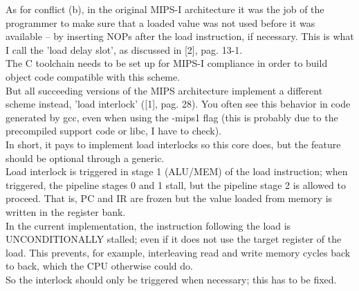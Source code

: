 \documentclass[11pt]{article}
\begin{document}
    As for conflict (b), in the original MIPS-I architecture it was the job
    of the programmer to make sure that a loaded value was not used before it
    was available -- by inserting NOPs after the load instruction, if necessary.
    This is what I call the 'load delay slot', as discussed in [2], pag. 13-1.\\
    
    The C toolchain needs to be set up for MIPS-I compliance in order to build
    object code compatible with this scheme.\\
    But all succeeding versions of the MIPS architecture implement a 
    different scheme instead, 'load interlock' ([1], pag. 28). You often see
    this behavior in code generated by gcc, even when using the -mips1 flag (this 
    is probably due to the precompiled support code or libc, I have to check).\\
    In short, it pays to implement load interlocks so this core does, but the
    feature should be optional through a generic.\\
    
    
    Load interlock is triggered in stage 1 (ALU/MEM) of the load instruction;
    when triggered, the pipeline stages 0 and 1 stall, but the pipeline stage
    2 is allowed to proceed. That is, PC and IR are frozen but the value loaded
    from memory is written in the register bank.\\
    
    In the current implementation, the instruction following the load is 
    UNCONDITIONALLY stalled; even if it does not use the target register of the 
    load. This prevents, for example, interleaving read and write memory cycles
    back to back, which the CPU otherwise could do.\\
    So the interlock should only be triggered when necessary; this has to be
    fixed.\\
\end{document}
